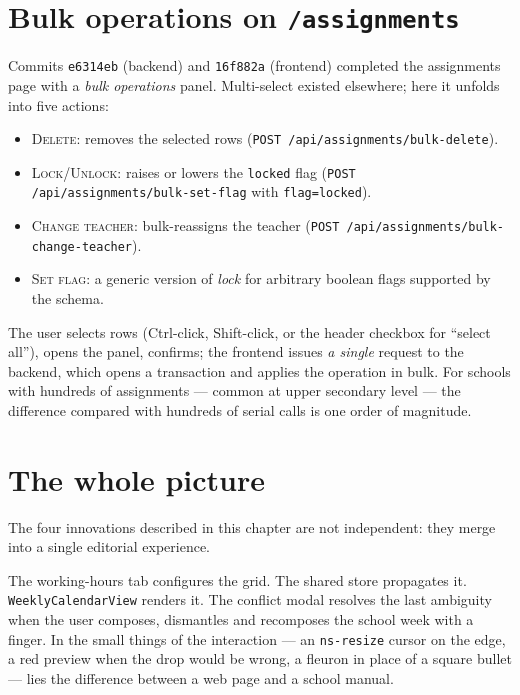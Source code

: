 \section{Bulk operations on \texttt{/assignments}}
\label{sec:bulk-en}

Commits \texttt{e6314eb} (backend) and \texttt{16f882a}
(frontend) completed the assignments page with a \emph{bulk
operations} panel. Multi-select existed elsewhere; here it
unfolds into five actions:

\begin{itemize}
  \item \textsc{Delete}: removes the selected rows
    (\texttt{POST /api/assignments/bulk-delete}).
  \item \textsc{Lock}/\textsc{Unlock}: raises or lowers the
    \texttt{locked} flag (\texttt{POST
    /api/assignments/bulk-set-flag} with \texttt{flag=locked}).
  \item \textsc{Change teacher}: bulk-reassigns the teacher
    (\texttt{POST /api/assignments/bulk-change-teacher}).
  \item \textsc{Set flag}: a generic version of \emph{lock} for
    arbitrary boolean flags supported by the schema.
\end{itemize}

The user selects rows (Ctrl-click, Shift-click, or the header
checkbox for ``select all''), opens the panel, confirms; the
frontend issues \emph{a single} request to the backend, which
opens a transaction and applies the operation in bulk. For
schools with hundreds of assignments --- common at upper
secondary level --- the difference compared with hundreds of
serial calls is one order of magnitude.

\section{The whole picture}

The four innovations described in this chapter are not
independent: they merge into a single editorial experience.

\fleuron

The working-hours tab configures the grid. The shared store
propagates it. \texttt{WeeklyCalendarView} renders it. The
conflict modal resolves the last ambiguity when the user
composes, dismantles and recomposes the school week with a
finger. In the small things of the interaction --- an
\texttt{ns-resize} cursor on the edge, a red preview when the
drop would be wrong, a fleuron in place of a square bullet ---
lies the difference between a web page and a school manual.

